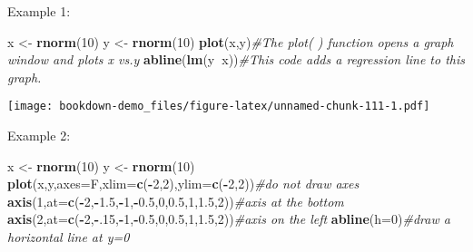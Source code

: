 \documentclass[]{book}
\newenvironment{Shaded}{\begin{snugshade}}{\end{snugshade}}
\newcommand{\KeywordTok}[1]{\textcolor[rgb]{0.13,0.29,0.53}{\textbf{#1}}}
\newcommand{\DataTypeTok}[1]{\textcolor[rgb]{0.13,0.29,0.53}{#1}}
\newcommand{\DecValTok}[1]{\textcolor[rgb]{0.00,0.00,0.81}{#1}}
\newcommand{\FloatTok}[1]{\textcolor[rgb]{0.00,0.00,0.81}{#1}}
\newcommand{\StringTok}[1]{\textcolor[rgb]{0.31,0.60,0.02}{#1}}
\newcommand{\CommentTok}[1]{\textcolor[rgb]{0.56,0.35,0.01}{\textit{#1}}}
\newcommand{\OperatorTok}[1]{\textcolor[rgb]{0.81,0.36,0.00}{\textbf{#1}}}
\newcommand{\NormalTok}[1]{#1}
\theoremstyle{definition}
\theoremstyle{definition}
\theoremstyle{definition}
\theoremstyle{remark}
\begin{document}
Example 1:

\begin{Shaded}
\begin{Highlighting}[]
\NormalTok{x <-}\StringTok{ }\KeywordTok{rnorm}\NormalTok{(}\DecValTok{10}\NormalTok{)}
\NormalTok{y <-}\StringTok{ }\KeywordTok{rnorm}\NormalTok{(}\DecValTok{10}\NormalTok{)}
\KeywordTok{plot}\NormalTok{(x,y)}\CommentTok{#The plot( ) function opens a graph window and plots x vs.y}
\KeywordTok{abline}\NormalTok{(}\KeywordTok{lm}\NormalTok{(y}\OperatorTok{~}\NormalTok{x))}\CommentTok{#This code adds a regression line to this graph.}
\end{Highlighting}
\end{Shaded}

\texttt{[image: bookdown-demo\_files/figure-latex/unnamed-chunk-111-1.pdf]}

Example 2:

\begin{Shaded}
\begin{Highlighting}[]
\NormalTok{x <-}\StringTok{ }\KeywordTok{rnorm}\NormalTok{(}\DecValTok{10}\NormalTok{)}
\NormalTok{y <-}\StringTok{ }\KeywordTok{rnorm}\NormalTok{(}\DecValTok{10}\NormalTok{)}
\KeywordTok{plot}\NormalTok{(x,y,}\DataTypeTok{axes=}\NormalTok{F,}\DataTypeTok{xlim=}\KeywordTok{c}\NormalTok{(}\OperatorTok{-}\DecValTok{2}\NormalTok{,}\DecValTok{2}\NormalTok{),}\DataTypeTok{ylim=}\KeywordTok{c}\NormalTok{(}\OperatorTok{-}\DecValTok{2}\NormalTok{,}\DecValTok{2}\NormalTok{))}\CommentTok{#do not draw axes}
\KeywordTok{axis}\NormalTok{(}\DecValTok{1}\NormalTok{,}\DataTypeTok{at=}\KeywordTok{c}\NormalTok{(}\OperatorTok{-}\DecValTok{2}\NormalTok{,}\OperatorTok{-}\FloatTok{1.5}\NormalTok{,}\OperatorTok{-}\DecValTok{1}\NormalTok{,}\OperatorTok{-}\FloatTok{0.5}\NormalTok{,}\DecValTok{0}\NormalTok{,}\FloatTok{0.5}\NormalTok{,}\DecValTok{1}\NormalTok{,}\FloatTok{1.5}\NormalTok{,}\DecValTok{2}\NormalTok{))}\CommentTok{#axis at the bottom}
\KeywordTok{axis}\NormalTok{(}\DecValTok{2}\NormalTok{,}\DataTypeTok{at=}\KeywordTok{c}\NormalTok{(}\OperatorTok{-}\DecValTok{2}\NormalTok{,}\OperatorTok{-}\NormalTok{.}\DecValTok{15}\NormalTok{,}\OperatorTok{-}\DecValTok{1}\NormalTok{,}\OperatorTok{-}\FloatTok{0.5}\NormalTok{,}\DecValTok{0}\NormalTok{,}\FloatTok{0.5}\NormalTok{,}\DecValTok{1}\NormalTok{,}\FloatTok{1.5}\NormalTok{,}\DecValTok{2}\NormalTok{))}\CommentTok{#axis on the left}
\KeywordTok{abline}\NormalTok{(}\DataTypeTok{h=}\DecValTok{0}\NormalTok{)}\CommentTok{#draw a horizontal line at y=0}
\end{Highlighting}
\end{Shaded}
\end{document}
